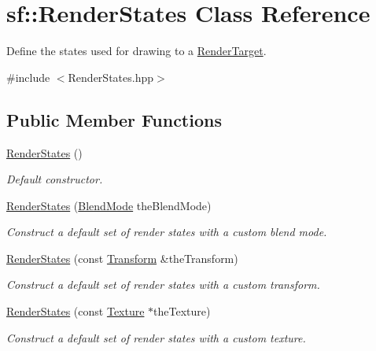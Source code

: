 \hypertarget{classsf_1_1RenderStates}{\section{sf\-:\-:Render\-States Class Reference}
\label{classsf_1_1RenderStates}
}


Define the states used for drawing to a \hyperlink{classsf_1_1RenderTarget}{Render\-Target}.  




{\ttfamily \#include $<$Render\-States.\-hpp$>$}

\subsection*{Public Member Functions}
\begin{DoxyCompactItemize}
\item 
\hyperlink{classsf_1_1RenderStates_a885bf14070d0d5391f062f62b270b7d0}{Render\-States} ()
\begin{DoxyCompactList}\small\item\em Default constructor. \end{DoxyCompactList}\item 
\hyperlink{classsf_1_1RenderStates_a4e3378a224f67513b95d58184e85210c}{Render\-States} (\hyperlink{group__graphics_ga80c52fe2f7050d7f7573b7ed3c995388}{Blend\-Mode} the\-Blend\-Mode)
\begin{DoxyCompactList}\small\item\em Construct a default set of render states with a custom blend mode. \end{DoxyCompactList}\item 
\hyperlink{classsf_1_1RenderStates_a3e99cad6ab05971d40357949930ed890}{Render\-States} (const \hyperlink{classsf_1_1Transform}{Transform} \&the\-Transform)
\begin{DoxyCompactList}\small\item\em Construct a default set of render states with a custom transform. \end{DoxyCompactList}\item 
\hyperlink{classsf_1_1RenderStates_a8f4ca3be0e27dafea0c4ab8547439bb1}{Render\-States} (const \hyperlink{classsf_1_1Texture}{Texture} $\ast$the\-Texture)
\begin{DoxyCompactList}\small\item\em Construct a default set of render states with a custom texture. \end{DoxyCompactList}\item 

\end{DoxyCompactItemize}
